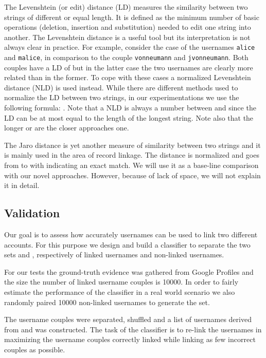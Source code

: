\documentclass[letterpaper]{sig-alternate}
\begin{document}
The Levenshtein (or edit) distance (LD) measures the similarity between two
strings of different or equal length. It is defined as the minimum number of
basic operations (deletion, insertion and substitution) needed to edit one string
into another.  The Levenshtein distance is a useful tool
but its interpretation is not always clear in practice.  For example, consider
the case of the usernames \texttt{alice} and \texttt{malice}, in comparison to
the couple \texttt{vonneumann} and \texttt{jvonneumann}. Both couples have a LD
of  but in the latter case the two usernames are clearly more related than
in the former. To cope with these cases a normalized Levenshtein distance (NLD)
is used instead. While there are different methods used to normalize the LD
between two strings, in our experimentations we use the following formula: . Note that a NLD is always a number
between  and  since the LD can be at most equal to the length of the
longest string. Note also that the longer  or  are the closer
 approaches one.

The Jaro distance \cite{jaro} is yet another measure of similarity between two
strings and it is mainly used in the area of record linkage. The distance is
normalized and goes from  to  with  indicating an exact match.
We will use it as a base-line comparison with our novel approaches.
However, because of lack of space, we will not explain it in detail.









\subsection{Validation}

Our goal is to assess how accurately usernames can be used to link two different accounts.
For this purpose we design and build a classifier to separate the two
sets  and , respectively of linked usernames and non-linked usernames.

For our tests the ground-truth evidence was gathered from Google Profiles and the
size the number of linked username couples  is 10000.
In order to fairly estimate the performance of the classifier in a real world
scenario we also randomly paired 10000 non-linked usernames to generate the  set.

The username couples were separated, shuffled and a list of
usernames derived from  and  was constructed.  The task of the
classifier is to re-link the usernames in  maximizing the username
couples correctly linked while linking as few incorrect couples as possible. 
\end{document}
